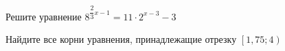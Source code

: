 \begin{ex}
	\begin{condition}
		\begin{enumcols}[label=\asbuk*)]
			\item Решите уравнение \( 8^{\dfrac{2}{3}x - 1} =  11\cdot 2^{x -3}-3 \)
			\item Найдите все корни уравнения, принадлежащие отрезку \( \left[1,75;4\right) \)
		\end{enumcols}
	\end{condition}
\end{ex}